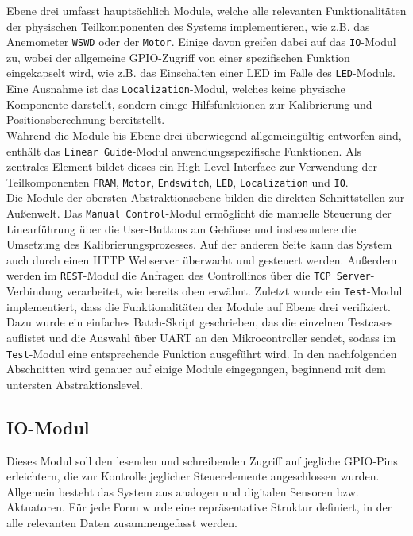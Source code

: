 \noindent
Ebene drei umfasst hauptsächlich Module, welche alle relevanten Funktionalitäten der physischen Teilkomponenten des Systems implementieren, wie z.B. das Anemometer \verb|WSWD| oder der \verb|Motor|. Einige davon greifen dabei auf das \verb|IO|-Modul zu, wobei der allgemeine GPIO-Zugriff von einer spezifischen Funktion eingekapselt wird, wie z.B. das Einschalten einer LED im Falle des \verb|LED|-Moduls. Eine Ausnahme ist das \verb|Localization|-Modul, welches keine physische Komponente darstellt, sondern einige Hilfsfunktionen zur Kalibrierung und Positionsberechnung bereitstellt.\\

\noindent
Während die Module bis Ebene drei überwiegend allgemeingültig entworfen sind, enthält das \verb|Linear Guide|-Modul anwendungsspezifische Funktionen. Als zentrales Element bildet dieses ein High-Level Interface zur Verwendung der Teilkomponenten \verb|FRAM|, \verb|Motor|, \verb|Endswitch|, \verb|LED|, \verb|Localization| und \verb|IO|. \\

\noindent
Die Module der obersten Abstraktionsebene bilden die direkten Schnittstellen zur Außenwelt. Das \verb|Manual Control|-Modul ermöglicht die manuelle Steuerung der Linearführung über die User-Buttons am Gehäuse und insbesondere die Umsetzung des Kalibrierungsprozesses. Auf der anderen Seite kann das System auch durch einen HTTP Webserver überwacht und gesteuert werden. Außerdem werden im \verb|REST|-Modul die Anfragen des Controllinos über die \verb|TCP Server|-Verbindung verarbeitet, wie bereits oben erwähnt. Zuletzt wurde ein \verb|Test|-Modul implementiert, dass die Funktionalitäten der Module auf Ebene drei verifiziert. Dazu wurde ein einfaches Batch-Skript geschrieben, das die einzelnen Testcases auflistet und die Auswahl über UART an den  Mikrocontroller sendet, sodass im \verb|Test|-Modul eine entsprechende Funktion ausgeführt wird. In den nachfolgenden Abschnitten wird genauer auf einige Module eingegangen, beginnend mit dem untersten Abstraktionslevel.

\subsection{IO-Modul}
Dieses Modul soll den lesenden und schreibenden Zugriff auf jegliche GPIO-Pins erleichtern, die zur Kontrolle jeglicher Steuerelemente angeschlossen wurden. Allgemein besteht das System aus analogen und digitalen Sensoren bzw. Aktuatoren. Für jede Form wurde eine repräsentative Struktur definiert, in der alle relevanten Daten zusammengefasst werden.
